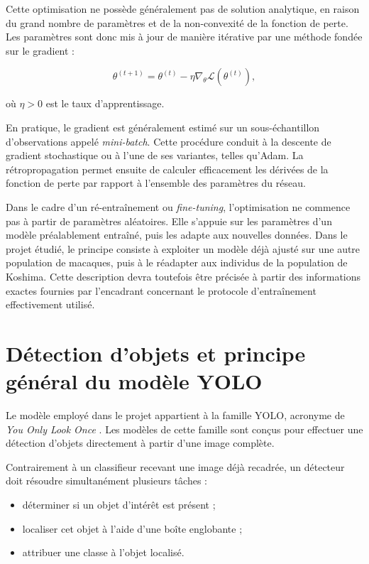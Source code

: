 \documentclass[11pt,a4paper]{report}
\begin{document}
Cette optimisation ne possède généralement pas de solution analytique, en
raison du grand nombre de paramètres et de la non-convexité de la fonction de
perte. Les paramètres sont donc mis à jour de manière itérative par une méthode
fondée sur le gradient :

\begin{equation}
    \theta^{(t+1)}
    =
    \theta^{(t)}
    -
    \eta
    \nabla_{\theta}
    \mathcal{L}
    \left(
        \theta^{(t)}
    \right),
    \label{eq:gradient}
\end{equation}

où $\eta>0$ est le taux d'apprentissage.

En pratique, le gradient est généralement estimé sur un sous-échantillon
d'observations appelé \emph{mini-batch}. Cette procédure conduit à la descente
de gradient stochastique ou à l'une de ses variantes, telles qu'Adam. La
rétropropagation permet ensuite de calculer efficacement les dérivées de la
fonction de perte par rapport à l'ensemble des paramètres du réseau.

Dans le cadre d'un ré-entraînement ou \emph{fine-tuning}, l'optimisation ne
commence pas à partir de paramètres aléatoires. Elle s'appuie sur les paramètres
d'un modèle préalablement entraîné, puis les adapte aux nouvelles données. Dans
le projet étudié, le principe consiste à exploiter un modèle déjà ajusté sur
une autre population de macaques, puis à le réadapter aux individus de la
population de Koshima. Cette description devra toutefois être précisée à partir
des informations exactes fournies par l'encadrant concernant le protocole
d'entraînement effectivement utilisé.

\section{Détection d'objets et principe général du modèle YOLO}

Le modèle employé dans le projet appartient à la famille YOLO, acronyme de
\emph{You Only Look Once} \citep{redmon2016}. Les modèles de cette famille sont
conçus pour effectuer une détection d'objets directement à partir d'une image
complète.

Contrairement à un classifieur recevant une image déjà recadrée, un détecteur
doit résoudre simultanément plusieurs tâches :

\begin{itemize}
    \item déterminer si un objet d'intérêt est présent ;
    \item localiser cet objet à l'aide d'une boîte englobante ;
    \item attribuer une classe à l'objet localisé.
\end{itemize}
\end{document}
